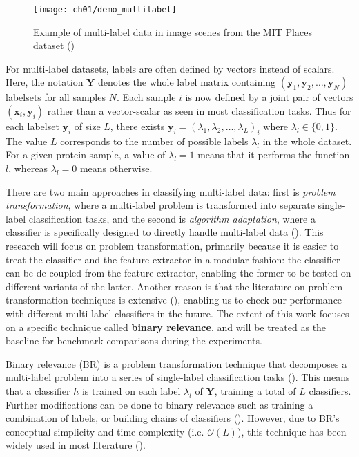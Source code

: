 \begin{figure}[!t]
  \centering
  \texttt{[image: ch01/demo\_multilabel]}
  \caption[Example of multi-label data in image scenes from MIT
  Places dataset]{
      Example of multi-label data in image scenes from the MIT
      Places dataset (\cite{zhou2014learning})}
  \label{demo:multilabel}
\end{figure}

\par For multi-label datasets, labels are often defined by vectors instead of scalars.
Here, the notation $\mathbf{Y}$ denotes the whole label matrix containing
$(\mathbf{y}_{1},\mathbf{y}_{2}, \dots, \mathbf{y}_{N})$
labelsets for all samples $N$. Each sample $i$ is now defined by a joint pair of
vectors $(\mathbf{x}_{i}, \mathbf{y}_{i})$ rather than a vector-scalar
as seen in most classification tasks. Thus for each labelset $\mathbf{y}_{i}$
of size $L$, there exists $\mathbf{y}_{i} = (\lambda_{1}, \lambda_{2}, \dots, \lambda_{L})_{i}$ where $\lambda_{l} \in \{0, 1\}$.  
The value $L$ corresponds to the number of possible labels $\lambda_{l}$
in the whole dataset. For a given protein sample, a value of
$\lambda_{l}=1$ means that it performs the function $l$, whereas $\lambda_{l}=0$
means otherwise.

\par There are two main approaches in classifying multi-label data: first is
\textit{problem transformation}, where a multi-label problem is transformed
into separate single-label classification tasks, and the second is
\textit{algorithm adaptation}, where a classifier is specifically designed to 
directly handle multi-label data (\cite{tsoumakas2007multilabel}). This research will focus
on problem transformation, primarily because it is easier to treat the classifier and the
feature extractor in a modular fashion: the classifier can be de-coupled from
the feature extractor, enabling the former to be tested on different variants
of the latter.  Another reason is that the literature on problem transformation
techniques is extensive (\cite{zhang2014review, madjarov2012extensive}), enabling us to
check our performance with different multi-label classifiers in the future. The extent of
this work focuses on a specific technique called \textbf{binary
relevance}, and will be treated as the baseline for benchmark comparisons
during the experiments.

\par Binary relevance (BR) is a problem transformation technique that decomposes a
multi-label problem into a series of single-label classification tasks
(\cite{boutell2004learning, tsoumakas2007multilabel}). This means that a
classifier $h$ is trained on each label $\lambda_l$ of $\mathbf{Y}$, training a total
of $L$ classifiers. Further modifications can be done to binary relevance such as
training a combination of labels, or building chains of classifiers
(\cite{read2009classifier}). However, due to BR's conceptual simplicity and
time-complexity (i.e. $\mathcal{O}(L)$), this technique has been widely used
in most literature (\cite{zhang2017binary}).

